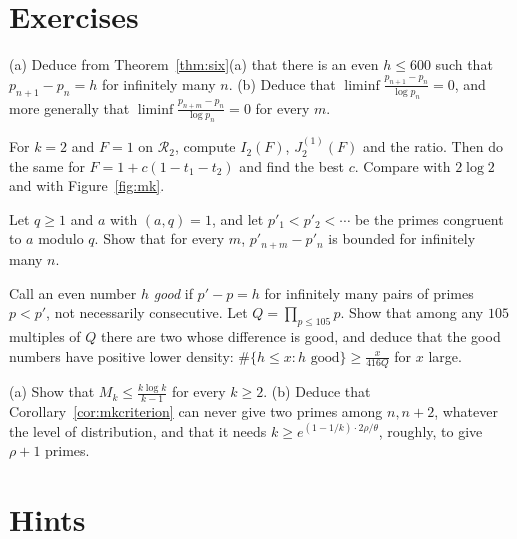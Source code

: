 \section{Exercises}

\begin{exercise}[$\star$]\label{ex:pigeon}
(a) Deduce from Theorem~\ref{thm:six}(a) that there is an even $h\le600$ such that $p_{n+1}-p_n=h$ for infinitely many $n$.
(b) Deduce that $\liminf\frac{p_{n+1}-p_n}{\log p_n}=0$, and more generally that $\liminf\frac{p_{n+m}-p_n}{\log p_n}=0$ for every $m$.
\end{exercise}

\begin{exercise}[$\star$]\label{ex:mtwo}
For $k=2$ and $F=1$ on $\mathcal R_2$, compute $I_2(F)$, $J_2^{(1)}(F)$ and the ratio. Then do the same for $F=1+c(1-t_1-t_2)$ and find the best $c$. Compare with $2\log2$ and with Figure~\ref{fig:mk}.
\end{exercise}

\begin{exercise}[$\star\star$]\label{ex:progs}
Let $q\ge1$ and $a$ with $(a,q)=1$, and let $p'_1<p'_2<\cdots$ be the primes congruent to $a$ modulo $q$. Show that for every $m$, $p'_{n+m}-p'_n$ is bounded for infinitely many $n$.
\end{exercise}

\begin{exercise}[$\star\star$]\label{ex:gooddiff}
Call an even number $h$ \emph{good} if $p'-p=h$ for infinitely many pairs of primes $p<p'$, not necessarily consecutive. Let $Q=\prod_{p\le105}p$. Show that among any $105$ multiples of $Q$ there are two whose difference is good, and deduce that the good numbers have positive lower density: $\#\{h\le x:h\text{ good}\}\ge\frac x{416Q}$ for $x$ large.
\end{exercise}

\begin{exercise}[$\star\star\star$]\label{ex:upper}
(a) Show that $M_k\le\frac{k\log k}{k-1}$ for every $k\ge2$.
(b) Deduce that Corollary~\ref{cor:mkcriterion} can never give two primes among $n,n+2$, whatever the level of distribution, and that it needs $k\ge e^{(1-1/k)\cdot2\rho/\theta}$, roughly, to give $\rho+1$ primes.
\end{exercise}

\section{Hints}

